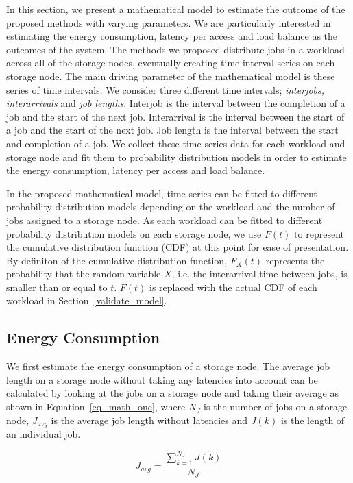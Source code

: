 In this section, we present a mathematical model to estimate the outcome
of the proposed methods with varying parameters. We are particularly interested
in estimating the energy consumption, latency per access and load balance as the outcomes
of the system. The methods we proposed distribute jobs in a workload across
all of the storage nodes, eventually creating time interval series on each
storage node. The main driving parameter of the mathematical model is these series of
time intervals. We consider three different time intervals;
\textit{interjobs, interarrivals} and \textit{job lengths}. Interjob is
the interval between the completion of a job and the start of the next
job. Interarrival is the interval between the start of a job and the
start of the next job. Job length is the interval between the start and
completion of a job. We collect these time series data for each workload
and storage node and fit them to probability distribution models in order
to estimate the energy consumption, latency per access and load balance.

In the proposed mathematical model, time series can be fitted to different
probability distribution models depending on the workload and the number
of jobs assigned to a storage node. As each workload can be fitted to
different probability distribution models on each storage node, we use
$F(t)$ to represent the cumulative distribution function (CDF) at this
point for ease of presentation. By definiton of the cumulative distribution function, $F_{X}(t)$ represents
the probability that the random variable $X$, i.e. the interarrival
time between jobs, is smaller than or equal to $t$.
$F(t)$ is replaced with the actual CDF
of each workload in Section~\ref{validate_model}.

\subsection{Energy Consumption}
We first estimate the energy consumption of a storage node.
The average job length
on a storage node without taking any latencies into account can be
calculated by
looking at the jobs on a storage node and taking their average as shown in 
Equation~\eqref{eq_math_one}, where $N_{J}$ is the number of jobs on a
storage node, $J_{avg}$ is the average job length without latencies and $J(k)$
is the length of an individual job.

\begin{equation}
J_{avg} = \frac{\sum\limits_{k=1}^{N_{J}} J(k)}{N_{J}}
\label{eq_math_one}
\end{equation}  
\hfill

